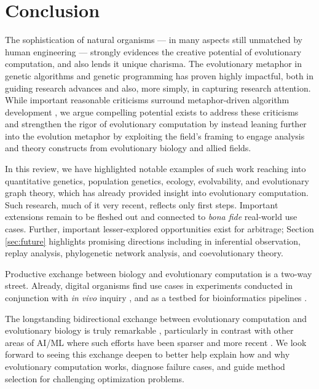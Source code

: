 \section{Conclusion} \label{sec:conclusion}

The sophistication of natural organisms --- in many aspects still unmatched by human engineering --- strongly evidences the creative potential of evolutionary computation, and also lends it unique charisma.
The evolutionary metaphor in genetic algorithms and genetic programming has proven highly impactful, both in guiding research advances and also, more simply, in capturing research attention.
While important reasonable criticisms surround metaphor-driven algorithm development \citep{moore2023evolution,sorensen2013metaheuristics}, we argue compelling potential exists to address these criticisms and strengthen the rigor of evolutionary computation by instead leaning further into the evolution metaphor by exploiting the field's framing to engage analysis and theory constructs from evolutionary biology and allied fields.

In this review, we have highlighted notable examples of such work reaching into quantitative genetics, population genetics, ecology, evolvability, and evolutionary graph theory, which has already provided insight into evolutionary computation.
Such research, much of it very recent, reflects only first steps.
Important extensions remain to be fleshed out and connected to \textit{bona fide} real-world use cases.
Further, important lesser-explored opportunities exist for arbitrage;
Section \ref{sec:future} highlights promising directions including in inferential observation, replay analysis, phylogenetic network analysis, and coevolutionary theory.

Productive exchange between biology and evolutionary computation is a two-way street.
Already, digital organisms find use cases in experiments conducted in conjunction with \textit{in vivo} inquiry \citep{sanjun2007selection,wilke2001evolution,hindr2012new}, and as a testbed for bioinformatics pipelines \citep{daudey2024aevol,haller2023slim,moreno2025extending,TODO}.

The longstanding bidirectional exchange between evolutionary computation and evolutionary biology is truly remarkable \citep{pennock2007models,goodman2020evolution}, particularly in contrast with other areas of AI/ML where such efforts have been sparser and more recent \citep{marblestone2016toward,richards2019deep}.
We look forward to seeing this exchange deepen to better help explain how and why evolutionary computation works, diagnose failure cases, and guide method selection for challenging optimization problems.

